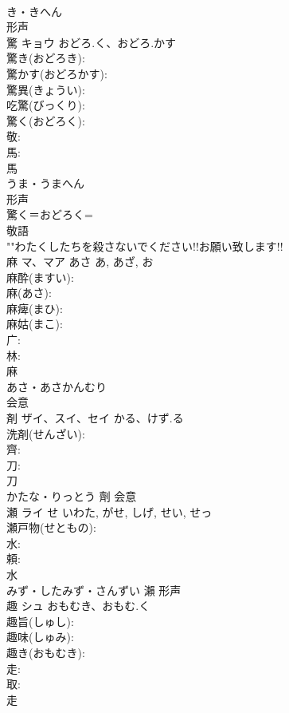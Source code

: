 \documentclass[8pt]{extreport}
\begin{document}
\begin{CJK}{UTF8}{min}
\\	き・きへん	
\\	形声 
\\	驚	キョウ	おどろ.く、おどろ.かす		
\\	驚き(おどろき): 
\\	驚かす(おどろかす): 
\\	驚異(きょうい): 
\\	吃驚(びっくり): 
\\	驚く(おどろく): 
\\	敬: 
\\	馬: 
\\	馬	
\\	うま・うまへん	
\\	形声 
\\	驚く＝おどろく= 
\\	敬語 
\\	""わたくしたちを殺さないでください!!お願い致します!!
\\	麻	マ、マア	あさ	あ, あざ, お	
\\	麻酔(ますい): 
\\	麻(あさ): 
\\	麻痺(まひ): 
\\	麻姑(まこ): 
\\	广: 
\\	林: 
\\	麻	
\\	あさ・あさかんむり	
\\	会意 
\\	剤	ザイ、スイ、セイ	かる、けず.る		
\\	洗剤(せんざい): 
\\	齊: 
\\	刀: 
\\	刀	
\\	かたな・りっとう	劑	会意 
\\	瀬	ライ	せ	いわた, がせ, しげ, せい, せっ	
\\	瀬戸物(せともの): 
\\	水: 
\\	頼: 
\\	水	
\\	みず・したみず・さんずい	瀨	形声 
\\	趣	シュ	おもむき、おもむ.く		
\\	趣旨(しゅし): 
\\	趣味(しゅみ): 
\\	趣き(おもむき): 
\\	走: 
\\	取: 
\\	走	

\end{CJK}
\end{document}
